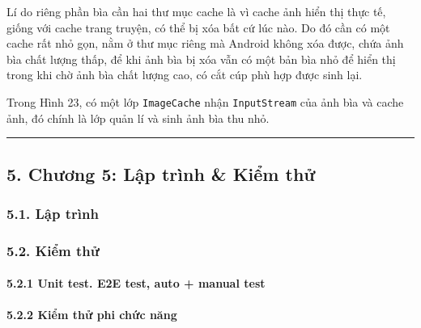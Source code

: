 \documentclass[
]{article}
\begin{document}
Lí do riêng phần bìa cần hai thư mục cache là vì cache ảnh hiển thị thực
tế, giống với cache trang truyện, có thể bị xóa bất cứ lúc nào. Do đó
cần có một cache rất nhỏ gọn, nằm ở thư mục riêng mà Android không xóa
được, chứa ảnh bìa chất lượng thấp, để khi ảnh bìa bị xóa vẫn có một bản
bìa nhỏ để hiển thị trong khi chờ ảnh bìa chất lượng cao, có cắt cúp phù
hợp được sinh lại.

Trong Hình 23, có một lớp \texttt{ImageCache} nhận \texttt{InputStream}
của ảnh bìa và cache ảnh, đó chính là lớp quản lí và sinh ảnh bìa thu
nhỏ.

\begin{center}\rule{0.5\linewidth}{0.5pt}\end{center}

\hypertarget{chux1b0ux1a1ng-5-lux1eadp-truxecnh-kiux1ec3m-thux1eed}{%
\subsection{\texorpdfstring{5. Chương 5: Lập trình \& Kiểm thử
}{5. Chương 5: Lập trình \& Kiểm thử }}\label{chux1b0ux1a1ng-5-lux1eadp-truxecnh-kiux1ec3m-thux1eed}}

\hypertarget{lux1eadp-truxecnh}{%
\subsubsection{\texorpdfstring{5.1. Lập trình
}{5.1. Lập trình }}\label{lux1eadp-truxecnh}}

\hypertarget{kiux1ec3m-thux1eed}{%
\subsubsection{\texorpdfstring{5.2. Kiểm thử
}{5.2. Kiểm thử }}\label{kiux1ec3m-thux1eed}}

\hypertarget{unit-test.-e2e-test-auto-manual-test}{%
\paragraph{\texorpdfstring{5.2.1 Unit test. E2E test, auto + manual test
}{5.2.1 Unit test. E2E test, auto + manual test }}\label{unit-test.-e2e-test-auto-manual-test}}

\hypertarget{kiux1ec3m-thux1eed-phi-chux1ee9c-nux103ng}{%
\paragraph{\texorpdfstring{5.2.2 Kiểm thử phi chức năng
}{5.2.2 Kiểm thử phi chức năng }}\label{kiux1ec3m-thux1eed-phi-chux1ee9c-nux103ng}}
\end{document}
